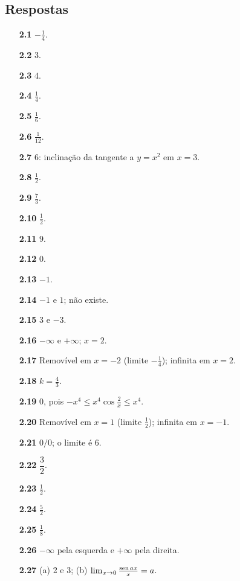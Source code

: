 \subsection*{Respostas}
{\small\begin{multicols}{2}\raggedright
\begin{itemize}[leftmargin=2.7em,labelsep=0.5em,itemsep=1pt]
\item[\textbf{2.1}] $-\tfrac14$.
\item[\textbf{2.2}] $3$.
\item[\textbf{2.3}] $4$.
\item[\textbf{2.4}] $\tfrac14$.
\item[\textbf{2.5}] $\tfrac16$.
\item[\textbf{2.6}] $\tfrac1{12}$.
\item[\textbf{2.7}] $6$: inclinação da tangente a $y=x^2$ em $x=3$.
\item[\textbf{2.8}] $\tfrac12$.
\item[\textbf{2.9}] $\tfrac73$.
\item[\textbf{2.10}] $\tfrac12$.
\item[\textbf{2.11}] $9$.
\item[\textbf{2.12}] $0$.
\item[\textbf{2.13}] $-1$.
\item[\textbf{2.14}] $-1$ e $1$; não existe.
\item[\textbf{2.15}] $3$ e $-3$.
\item[\textbf{2.16}] $-\infty$ e $+\infty$; $x=2$.
\item[\textbf{2.17}] Removível em $x=-2$ (limite $-\tfrac14$); infinita em $x=2$.
\item[\textbf{2.18}] $k=\tfrac43$.
\item[\textbf{2.19}] $0$, pois $-x^4\le x^4\cos\tfrac2x\le x^4$.
\item[\textbf{2.20}] Removível em $x=1$ (limite $\tfrac12$); infinita em $x=-1$.
\item[\textbf{2.21}] $0/0$; o limite é 6.
\item[\textbf{2.22}] $\dfrac32$.
\item[\textbf{2.23}] $\tfrac12$.
\item[\textbf{2.24}] $\tfrac52$.
\item[\textbf{2.25}] $\tfrac18$.
\item[\textbf{2.26}] $-\infty$ pela esquerda e $+\infty$ pela direita.
\item[\textbf{2.27}] (a) 2 e 3; (b) $\lim_{x\to0}\frac{\operatorname{sen} ax}{x}=a$.

\end{itemize}
\end{multicols}}
